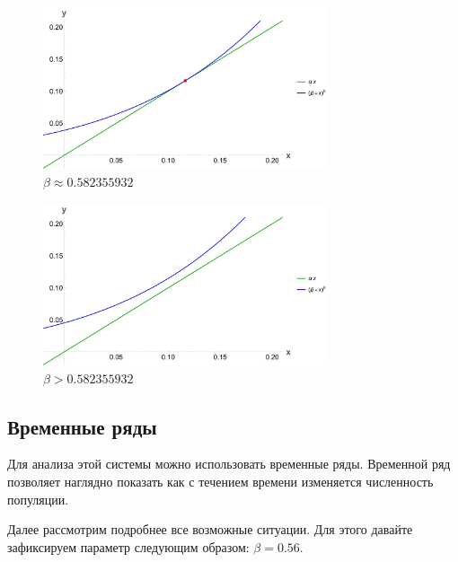         \begin{figure}
            \centering
            \includegraphics[width=0.75\textwidth]{images/main_touch.jpg}

            \captionsetup{justification=centering}
            \caption{\(\beta \approx 0.582355932\)}
            \label{mainTouch}
        \end{figure}

        \begin{figure}
            \centering
            \includegraphics[width=0.75\textwidth]{images/main_over.jpg}

            \captionsetup{justification=centering}
            \caption{\(\beta > 0.582355932\)}
            \label{mainOver}
        \end{figure}

    \subsection{Временные ряды}

        Для анализа этой системы можно использовать временные ряды. Временной ряд позволяет наглядно показать как с течением времени изменяется численность популяции.

        Далее рассмотрим подробнее все возможные ситуации. Для этого давайте зафиксируем параметр следующим образом: \(\beta = 0.56\). 

